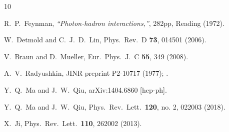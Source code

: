 \begin{thebibliography}{10}


  R.~P.~Feynman,
  {\it ``Photon-hadron interactions,''}, 282pp,
  Reading (1972).




  W.~Detmold and C.~J.~D.~Lin,
  Phys.\ Rev.\ D {\bf 73}, 014501 (2006).


  V.~Braun and D.~Mueller,
  Eur.\ Phys.\ J.\ C {\bf 55}, 349 (2008).



  A.~V.~Radyushkin,
JINR preprint P2-10717 (1977); \newline
  [hep-ph/0410276].

  Y.~Q.~Ma and J.~W.~Qiu,
  arXiv:1404.6860 [hep-ph].


  Y.~Q.~Ma and J.~W.~Qiu,
  Phys.\ Rev.\ Lett.\  {\bf 120}, no. 2, 022003 (2018).


  X.~Ji,
  Phys.\ Rev.\ Lett.\  {\bf 110}, 262002 (2013).



\end{thebibliography}
